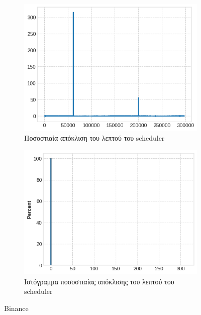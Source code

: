 \documentclass[12pt, a4paper]{article}
\begin{document}
\begin{figure}[h!]
\begin{subfigure}[b]{0.45\textwidth}
\centering
\includegraphics[width=\textwidth]{delay_candlestick_line_binance.png}
\caption{Ποσοστιαία απόκλιση του λεπτού του scheduler}
\label{fig:sub3}
\end{subfigure}
\hfill
\begin{subfigure}[b]{0.45\textwidth}
\centering
\includegraphics[width=\textwidth]{delay_candlestick_hist_binance.png}
\caption{Ιστόγραμμα ποσοστιαίας απόκλισης του λεπτού του scheduler}
\end{subfigure}
\caption{Binance}
\end{figure}
\end{document}
